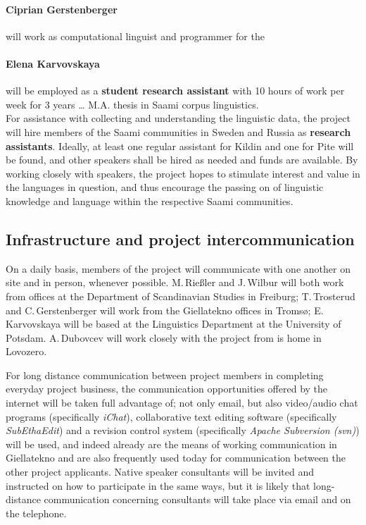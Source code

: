 \documentclass[a4paper,12pt]{article}
\begin{document}
{{{{\paragraph{Ciprian Gerstenberger} will work as computational linguist and programmer for the 

\paragraph{Elena Karvovskaya} will be employed as a \textbf{student research assistant} with 10 hours of work per week for 3 years … M.A. thesis in Saami corpus linguistics.\\

For assistance with collecting and understanding the linguistic data, the project will hire members of the Saami communities in Sweden and Russia as \textbf{research assistants}. %
Ideally, at least one regular assistant for Kildin and one for Pite will be found, and other speakers shall be hired as needed and funds are available. By working closely with speakers, the project hopes to stimulate interest and value in the languages in question, and thus encourage the passing on of linguistic knowledge and language within the respective Saami communities.

\subsection{Infrastructure and project intercommunication}
On a daily basis, members of the project will communicate with one another on site and in person, whenever possible. M.\,Rießler and J.\,Wilbur will both work from offices at the Department of Scandinavian Studies in Freiburg; T.\,Trosterud and C.\,Gerstenberger will work from the Giellatekno offices in Tromsø; E.\,Karvovskaya will be based at the Linguistics Department at the University of Potsdam. A.\,Dubovcev will work closely with the project from is home in Lovozero.

For long distance communication between project members in completing everyday project business, the communication opportunities offered by the internet will be taken full advantage of; not only email, but also video/audio chat programs (specifically \textit{iChat}), collaborative text editing software (specifically \textit{SubEthaEdit}) and a revision control system (specifically \textit{Apache Subversion (svn)}) will be used, and indeed already are the means of working communication in Giellatekno and are also frequently used today for communication between the other project applicants. Native speaker consultants will be invited and instructed on how to participate in the same ways, but it is likely that long-distance communication concerning consultants will take place via email and on the telephone.

}}}}
\end{document}
